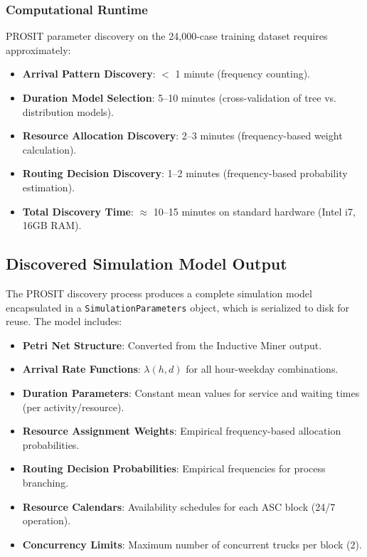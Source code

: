         \subsubsection{Computational Runtime}
        
        PROSIT parameter discovery on the 24,000-case training dataset requires approximately:
        
        \begin{itemize}
            \item \textbf{Arrival Pattern Discovery}: $<$ 1 minute (frequency counting).
            \item \textbf{Duration Model Selection}: 5--10 minutes (cross-validation of tree vs. distribution models).
            \item \textbf{Resource Allocation Discovery}: 2--3 minutes (frequency-based weight calculation).
            \item \textbf{Routing Decision Discovery}: 1--2 minutes (frequency-based probability estimation).
            \item \textbf{Total Discovery Time}: $\approx$ 10--15 minutes on standard hardware (Intel i7, 16GB RAM).
        \end{itemize}

    \subsection{Discovered Simulation Model Output}
    
    The PROSIT discovery process produces a complete simulation model encapsulated in a \texttt{SimulationParameters} object, which is serialized to disk for reuse. The model includes:
    
    \begin{itemize}
        \item \textbf{Petri Net Structure}: Converted from the Inductive Miner output.
        \item \textbf{Arrival Rate Functions}: $\lambda(h, d)$ for all hour-weekday combinations.
        \item \textbf{Duration Parameters}: Constant mean values for service and waiting times (per activity/resource).
        \item \textbf{Resource Assignment Weights}: Empirical frequency-based allocation probabilities.
        \item \textbf{Routing Decision Probabilities}: Empirical frequencies for process branching.
        \item \textbf{Resource Calendars}: Availability schedules for each ASC block (24/7 operation).
        \item \textbf{Concurrency Limits}: Maximum number of concurrent trucks per block (2).
    \end{itemize}
    

